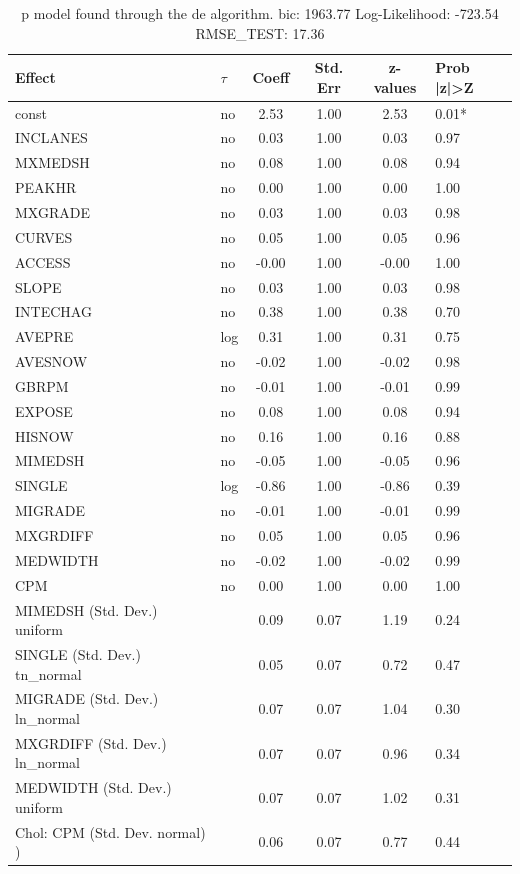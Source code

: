 \begin{table}
	\caption{p model found through the de algorithm. bic: 1963.77 Log-Likelihood: -723.54 RMSE_TEST: 17.36}
	\begin{center}
		\begin{tabular}{|l|l|c|c|c|l|}
			\hline
			Effect & $\tau$ & Coeff & Std. Err & z-values & Prob |z|>Z \\
			\hline
			const & no & 2.53 & 1.00 & 2.53 & 0.01* \\
			\hline
			INCLANES & no & 0.03 & 1.00 & 0.03 & 0.97 \\
			\hline
			MXMEDSH & no & 0.08 & 1.00 & 0.08 & 0.94 \\
			\hline
			PEAKHR & no & 0.00 & 1.00 & 0.00 & 1.00 \\
			\hline
			MXGRADE & no & 0.03 & 1.00 & 0.03 & 0.98 \\
			\hline
			CURVES & no & 0.05 & 1.00 & 0.05 & 0.96 \\
			\hline
			ACCESS & no & -0.00 & 1.00 & -0.00 & 1.00 \\
			\hline
			SLOPE & no & 0.03 & 1.00 & 0.03 & 0.98 \\
			\hline
			INTECHAG & no & 0.38 & 1.00 & 0.38 & 0.70 \\
			\hline
			AVEPRE & log & 0.31 & 1.00 & 0.31 & 0.75 \\
			\hline
			AVESNOW & no & -0.02 & 1.00 & -0.02 & 0.98 \\
			\hline
			GBRPM & no & -0.01 & 1.00 & -0.01 & 0.99 \\
			\hline
			EXPOSE & no & 0.08 & 1.00 & 0.08 & 0.94 \\
			\hline
			HISNOW & no & 0.16 & 1.00 & 0.16 & 0.88 \\
			\hline
			MIMEDSH & no & -0.05 & 1.00 & -0.05 & 0.96 \\
			\hline
			SINGLE & log & -0.86 & 1.00 & -0.86 & 0.39 \\
			\hline
			MIGRADE & no & -0.01 & 1.00 & -0.01 & 0.99 \\
			\hline
			MXGRDIFF & no & 0.05 & 1.00 & 0.05 & 0.96 \\
			\hline
			MEDWIDTH & no & -0.02 & 1.00 & -0.02 & 0.99 \\
			\hline
			CPM & no & 0.00 & 1.00 & 0.00 & 1.00 \\
			\hline
			MIMEDSH (Std. Dev.) uniform &  & 0.09 & 0.07 & 1.19 & 0.24 \\
			\hline
			SINGLE (Std. Dev.) tn_normal &  & 0.05 & 0.07 & 0.72 & 0.47 \\
			\hline
			MIGRADE (Std. Dev.) ln_normal &  & 0.07 & 0.07 & 1.04 & 0.30 \\
			\hline
			MXGRDIFF (Std. Dev.) ln_normal &  & 0.07 & 0.07 & 0.96 & 0.34 \\
			\hline
			MEDWIDTH (Std. Dev.) uniform &  & 0.07 & 0.07 & 1.02 & 0.31 \\
			\hline
			 Chol: CPM (Std. Dev. normal) ) &  & 0.06 & 0.07 & 0.77 & 0.44 \\
			\hline
		\end{tabular}
	\end{center}
\end{table}